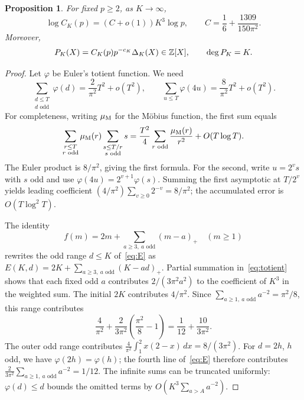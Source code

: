 \documentclass[11pt,letterpaper]{article}
\numberwithin{equation}{section}
\newtheorem{proposition}[theorem]{Proposition}
\theoremstyle{remark}\newtheorem{remark}[theorem]{Remark}
\begin{document}
\begin{proposition}\label{prop:cost}
For fixed $p\ge2$, as $K\to\infty$,
\begin{equation}\label{eq:cost}
 \log C_K(p)=(C+o(1))K^3\log p,\qquad
 C=\frac16+\frac{1309}{150\pi^2}.
\end{equation}
Moreover,
\begin{equation}\label{eq:integerpoly}
 P_K(X)=C_K(p)p^{-c_K}\Delta_K(X)\in\mathbb Z[X],\qquad \deg P_K=K.
\end{equation}
\end{proposition}
\begin{proof}
Let $\varphi$ be Euler's totient function. We need
\begin{equation}\label{eq:totient}
 \sum_{\substack{d\le T\\d\text{ odd}}}\varphi(d)
 =\frac{2}{\pi^2}T^2+o(T^2),\qquad
 \sum_{u\le T}\varphi(4u)=\frac{8}{\pi^2}T^2+o(T^2).
\end{equation}
For completeness, writing $\mu_{\rm M}$ for the M\"obius function, the first sum equals
\begin{equation*}
 \sum_{\substack{r\le T\\r\text{ odd}}}\mu_{\rm M}(r)
       \sum_{\substack{s\le T/r\\s\text{ odd}}}s
 =\frac{T^2}{4}\sum_{r\text{ odd}}\frac{\mu_{\rm M}(r)}{r^2}
   +O(T\log T).
\end{equation*}
The Euler product is $8/\pi^2$, giving the first formula. For the second, write $u=2^vs$ with $s$ odd and use $\varphi(4u)=2^{v+1}\varphi(s)$. Summing the first asymptotic at $T/2^v$ yields leading coefficient
$(4/\pi^2)\sum_{v\ge0}2^{-v}=8/\pi^2$; the accumulated error is $O(T\log^2 T)$.

The identity
\begin{equation*}
 f(m)=2m+\sum_{a\ge3,\ a\text{ odd}}(m-a)_+\quad(m\ge1)
\end{equation*}
rewrites the odd range $d\le K$ of~\eqref{eq:E} as
$E(K,d)=2K+\sum_{a\ge3,\ a\text{ odd}}(K-ad)_+$.
Partial summation in~\eqref{eq:totient} shows that each fixed odd $a$ contributes $2/(3\pi^2a^2)$ to the coefficient of $K^3$ in the weighted sum. The initial $2K$ contributes $4/\pi^2$. Since $\sum_{a\ge1,\ a\text{ odd}}a^{-2}=\pi^2/8$, this range contributes
\begin{equation*}
 \frac4{\pi^2}+\frac2{3\pi^2}\left(\frac{\pi^2}{8}-1\right)
 =\frac1{12}+\frac{10}{3\pi^2}.
\end{equation*}
The outer odd range contributes
$\frac4{\pi^2}\int_1^2 x(2-x)\,dx=8/(3\pi^2)$.
For $d=2h$, $h$ odd, we have $\varphi(2h)=\varphi(h)$; the fourth line of~\eqref{eq:E} therefore contributes
$\frac2{3\pi^2}\sum_{a\ge1,\ a\text{ odd}}a^{-2}=1/12$.
The infinite sums can be truncated uniformly: $\varphi(d)\le d$ bounds the omitted terms by $O(K^3\sum_{a>A}a^{-2})$.


\end{proof}
\end{document}
